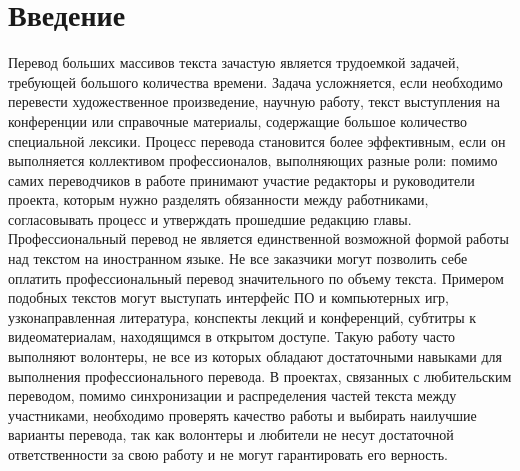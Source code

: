 \documentclass[a4paper,12pt]{article}
\begin{document}



\newpage

\tableofcontents




\newpage
\section*{Введение}

Перевод больших массивов текста зачастую является трудоемкой задачей, требующей большого количества времени. Задача усложняется, если необходимо перевести художественное произведение, научную работу, текст выступления на конференции или справочные материалы, содержащие большое количество специальной лексики. Процесс перевода становится более эффективным, если он выполняется коллективом профессионалов, выполняющих разные роли: помимо самих переводчиков в работе принимают участие редакторы и руководители проекта, которым нужно разделять обязанности между работниками, согласовывать процесс и утверждать прошедшие редакцию главы. \\

Профессиональный перевод не является единственной возможной формой работы над текстом на иностранном языке. Не все заказчики могут позволить себе оплатить профессиональный перевод значительного по объему текста. Примером подобных текстов могут выступать интерфейс ПО и компьютерных игр, узконаправленная литература, конспекты лекций и конференций, субтитры к видеоматериалам, находящимся в открытом доступе. Такую работу часто выполняют волонтеры, не все из которых обладают достаточными навыками для выполнения профессионального перевода. В проектах, связанных с любительским переводом, помимо синхронизации и распределения частей текста между участниками, необходимо проверять качество работы и выбирать наилучшие варианты перевода, так как волонтеры и любители не несут достаточной ответственности за свою работу и не могут гарантировать его верность. \\
\end{document}
